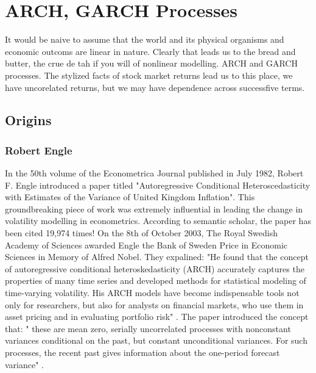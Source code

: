 
\section{ARCH, GARCH Processes}
It would be naive to assume that the world and its physical organisms and economic outcoms are linear in nature. Clearly that leads us to the bread and butter, the crue de tah if you will of nonlinear modelling. ARCH and GARCH processes. The stylized facts of stock market returns lead us to this place, we have uncorelated returns, but we may have dependence across successfive terms. 

\subsection{Origins}
\subsubsection{Robert Engle}
In the 50th volume of the Econometrica Journal published in July 1982, Robert F. Engle introduced a paper titled "Autoregressive Conditional Heteroscedasticity with Estimates of the Variance of United Kingdom Inflation". This groundbreaking piece of work was extremely influential in leading the change in volatility modelling in econometrics. According to semantic scholar, the paper has been cited 19,974 times! On the 8th of October 2003, The Royal Swedish Academy of Sciences awarded Engle the Bank of Sweden Price in Economic Sciences in Memory of Alfred Nobel. They expalined: "He found that the concept of autoregressive conditional heteroskedasticity (ARCH) accurately captures the properties of many time series and developed methods for statistical modeling of time-varying volatility. His ARCH models have become indispensable tools not only for researchers, but also for analysts on financial markets, who use them in asset pricing and in evaluating portfolio risk" \cite{pressrelease_2003}. The paper introduced the concept that: " these are mean zero, serially uncorrelated processes with nonconstant variances conditional on the past, but constant unconditional variances. For such processes, the recent past gives information about the one-period forecast variance" \cite{engleOriginal}. 

